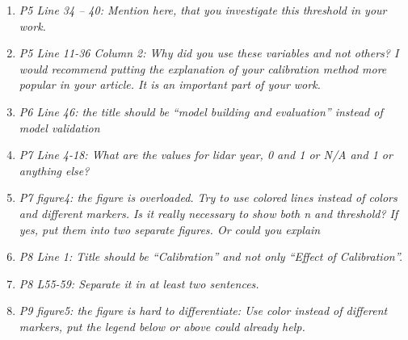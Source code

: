 \documentclass{article}
\begin{document}
\begin{enumerate}
	\item \textit{P5 Line 34 – 40: Mention here, that you investigate this threshold in your work.}
	
    \answer{}


	\item \textit{P5 Line 11-36 Column 2: Why did you use these variables and not others? I would recommend putting the explanation of your calibration method more popular in your article. It is an important part of your work.}

    \answer{}
	
	\item \textit{P6 Line 46: the title should be “model building and evaluation” instead of model validation}
	
    \answer{}
	
	\item \textit{P7 Line 4-18: What are the values for lidar year,   0 and 1 or N/A and 1 or anything else?}

   \answer{}

	\item \textit{P7 figure4: the figure is overloaded. Try to use colored lines instead of colors and different markers. Is it really necessary to show both n and threshold? If yes, put them into two separate figures. Or could you explain}
	

	
	\item \textit{P8 Line 1: Title should be “Calibration” and not only “Effect of Calibration”.}
    \answer{}
	
	\item \textit{P8 L55-59: Separate it in at least two sentences. }

    \answer{}

	
	\item \textit{P9 figure5: the figure is hard to differentiate:  Use color instead of different markers, put the legend below or above could already help. }
	

\end{enumerate}
\end{document}
